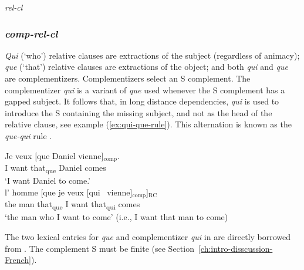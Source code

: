 \ea \textit{rel-cl} 
\z 


\subsubsection{\textit{comp-rel-cl}}\largerpage

\emph{Qui} (`who') relative clauses are extractions of the subject (regardless of animacy); \emph{que} (`that') relative clauses are extractions of the object; and both \emph{qui} and \emph{que} are complementizers. Complementizers select an S complement. The complementizer \emph{qui} is a variant of \emph{que} used whenever the S complement has a gapped subject. It follows that, in long distance dependencies, \emph{qui} is used to introduce the S containing the missing subject, and not as the head of the relative clause, see example (\ref{ex:qui-que-rule}). This alternation is known as the \emph{que-qui} rule \citep[see a.o.][]{Pesetsky.1982,Koopman.2014}. 

\eal\label{ex:qui-que-rule}
\ex \gll Je veux [que Daniel vienne]$_{\text{comp}}$.\\
I want \sbar{}that\textsubscript{que} Daniel comes\\
\glt `I want Daniel to come.'
\ex \citep[194]{Melis.1988}\\
\gll l' homme [que je veux [qui~\trace{} vienne]$_{\text{comp}}$]$_{\text{RC}}$\\
the man \sbar{}that\textsubscript{que} I want \sbar{}that\textsubscript{qui} comes\\
\glt `the man who I want to come' (i.e., I want that man to come)
\zl 

The two lexical entries for \emph{que} and complementizer \emph{qui} in  are directly borrowed from \citet[50]{Abeille.2007.Relatives}. The complement S must be finite (see Section~\ref{ch:intro-disscussion-French}).\largerpage

